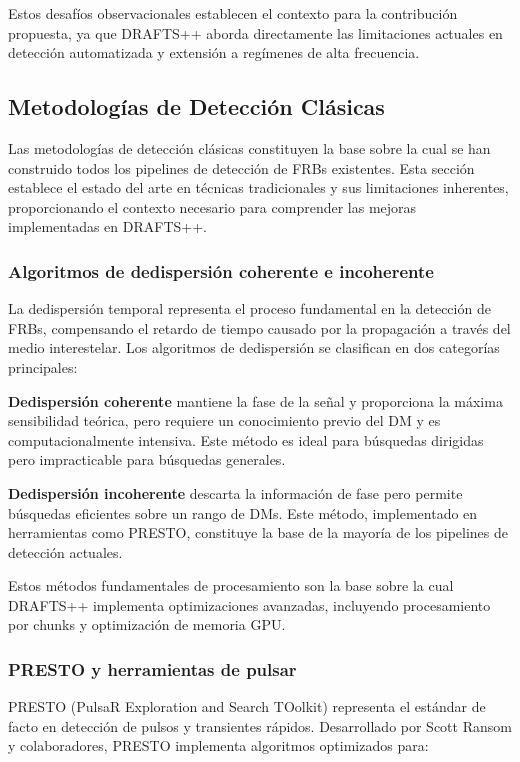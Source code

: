 Estos desafíos observacionales establecen el contexto para la contribución propuesta, ya que DRAFTS++ aborda directamente las limitaciones actuales en detección automatizada y extensión a regímenes de alta frecuencia.

\subsection{Metodologías de Detección Clásicas}

Las metodologías de detección clásicas constituyen la base sobre la cual se han construido todos los pipelines de detección de FRBs existentes. Esta sección establece el estado del arte en técnicas tradicionales y sus limitaciones inherentes, proporcionando el contexto necesario para comprender las mejoras implementadas en DRAFTS++.

\subsubsection{Algoritmos de dedispersión coherente e incoherente}

La dedispersión temporal representa el proceso fundamental en la detección de FRBs, compensando el retardo de tiempo causado por la propagación a través del medio interestelar. Los algoritmos de dedispersión se clasifican en dos categorías principales:

\textbf{Dedispersión coherente} mantiene la fase de la señal y proporciona la máxima sensibilidad teórica, pero requiere un conocimiento previo del DM y es computacionalmente intensiva. Este método es ideal para búsquedas dirigidas pero impracticable para búsquedas generales.

\textbf{Dedispersión incoherente} descarta la información de fase pero permite búsquedas eficientes sobre un rango de DMs. Este método, implementado en herramientas como PRESTO, constituye la base de la mayoría de los pipelines de detección actuales.

Estos métodos fundamentales de procesamiento son la base sobre la cual DRAFTS++ implementa optimizaciones avanzadas, incluyendo procesamiento por chunks y optimización de memoria GPU.

\subsubsection{PRESTO y herramientas de pulsar}

PRESTO (PulsaR Exploration and Search TOolkit) \cite{Ransom_2003} representa el estándar de facto en detección de pulsos y transientes rápidos. Desarrollado por Scott Ransom y colaboradores, PRESTO implementa algoritmos optimizados para:

